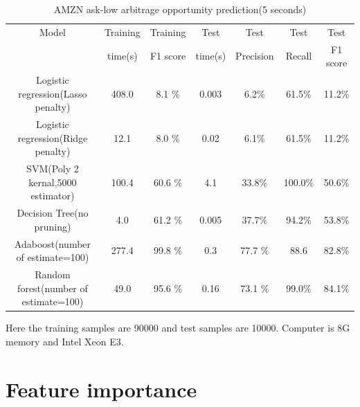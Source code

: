 \begin{table}[htp!]
	\caption{AMZN ask-low arbitrage opportunity prediction(5 seconds)}
	\label{ask_low_prediction}
	\begin{center}
		\begin{tabular}{|c|c|c|c|c|c|c|}
			\hline
			 Model& Training & Training  & Test  & Test & Test & Test \\[5pt]
			 & time(s) & F1 score & time(s) & Precision & Recall & F1 score \\[5pt]
			 \hline
			 Logistic regression(Lasso penalty)& 408.0 & 8.1 \% & 0.003 & 6.2\% & 61.5\%& 11.2\%\\[5pt]
			 Logistic regression(Ridge penalty)& 12.1 & 8.0 \% & 0.02 &  6.1\% & 61.5\%& 11.2\%\\[5pt]
			 SVM(Poly 2 kernal,5000 estimator)& 100.4 & 60.6 \% & 4.1 &  33.8\% & 100.0\%& 50.6\%\\[5pt]
			 Decision Tree(no pruning)& 4.0 & 61.2 \% & 0.005 &  37.7\% & 94.2\%& 53.8\%\\[5pt]
			 Adaboost(number of estimate=100)& 277.4 & 99.8 \% & 0.3 & 77.7 \% & 88.6 &  82.8\% \\[5pt]
			 Random forest(number of estimate=100)& 49.0 & 95.6 \% & 0.16 & 73.1 \% & 99.0\% &  84.1\% \\[5pt]		 	
	 		\hline 
		\end{tabular}
	\end{center}
\end{table}
 
Here the training samples are 90000 and test samples are 10000. Computer is 8G memory and Intel Xeon E3. \\

\section{Feature importance}


